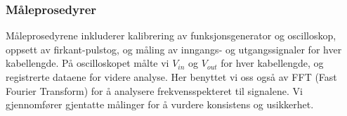 \subsubsection{Måleprosedyrer}
Måleprosedyrene inkluderer kalibrering av funksjonsgenerator og oscilloskop, oppsett av firkant-pulstog, og måling av inngangs- og utgangssignaler for hver kabellengde. På oscilloskopet målte vi $V_{in}$ og $V_{out}$ for hver kabellengde, og registrerte dataene for videre analyse. Her benyttet vi oss også av FFT (Fast Fourier Transform) for å analysere frekvensspekteret til signalene. Vi gjennomfører gjentatte målinger for å vurdere konsistens og usikkerhet.

